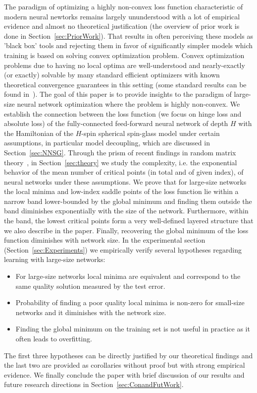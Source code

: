 \documentclass[twoside]{article}
\begin{document}
The paradigm of optimizing a highly non-convex loss function characteristic of modern neural newtorks remains largely ununderstood with a lot of empirical evidence and almost no theoretical justification (the overview of prior work is done in Section~\ref{sec:PriorWork}). That results in often perceiving these models as 'black box' tools and rejecting them in favor of significantly simpler models which training is based on solving convex optimization problem. Convex optimization problems due to having no local optima are well-understood and nearly-exactly (or exactly) solvable by many standard efficient optimizers with known theoretical convergence guarantees in this setting (some standard results can be found in~\cite{opac-b1104789, ben-tal_nemirovski:2001}). The goal of this paper is to provide insights to the paradigm of large-size neural network optimization where the problem is highly non-convex. We establish the connection between the loss function (we focus on hinge loss and absolute loss) of the fully-connected feed-forward neural network of depth $H$ with the Hamiltonian of the $H$-spin spherical spin-glass model under certain assumptions, in particular model decoupling, which are discussed in Section~\ref{sec:NNSG}. Through the prism of recent findings in random matrix theory~\cite{AAC2010}, in Section~\ref{sec:theory} we study the complexity, i.e. the exponential behavior of the mean number of critical points (in total and of given index), of neural networks under these assumptions. We prove that for large-size networks the local minima and low-index saddle points of the loss function lie within a narrow band lower-bounded by the global minimum and finding them outside the band diminishes exponentially with the size of the network. Furthermore, within the band, the lowest critical points form a very well-defined layered structure that we also describe in the paper. Finally, recovering the global minimum of the loss function diminishes with network size. In the experimental section (Section~\ref{sec:Experiments}) we empirically verify several hypotheses regarding learning with large-size networks:
\vspace{-0.05in}
\begin{itemize}
\item For large-size networks local minima are equivalent and correspond to the same quality solution measured by the test error.
\vspace{-0.05in}
\item Probability of finding a poor quality local minima is non-zero for small-size networks and it diminishes with the network size.
\vspace{-0.05in}
\item Finding the global minimum on the training set is not useful in practice as it often leads to overfitting.
\end{itemize}
\vspace{-0.05in}
The first three hypotheses can be directly justified by our theoretical findings and the last two are provided as corollaries without proof but with strong empirical evidence. We finally conclude the paper with brief discussion of our results and future research directions in Section~\ref{sec:ConandFutWork}. 
\end{document}
